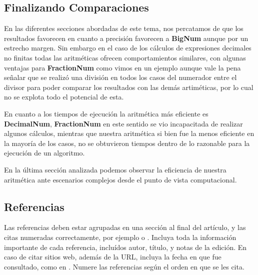 \documentclass[a4paper,10pt,twocolumn]{article}
\begin{document}
\subsection{Finalizando Comparaciones}\label{sub:big}
	En las diferentes secciones abordadas de este tema, nos percatamos de que los resultados favorecen en cuanto a precisión favorecen a \textbf{BigNum} aunque por un estrecho margen. Sin embargo en el caso de los cálculos de expresiones decimales no finitas todas las aritméticas ofrecen comportamientos similares, con algunas ventajas para \textbf{FractionNum} como vimos en un ejemplo aunque vale la pena señalar que se realizó una división en todos los casos del numerador entre el divisor para poder comparar los resultados con las demás artiméticas, por lo cual no se explota todo el potencial de esta.
	
	En cuanto a los tiempos de ejecución la aritmética más eficiente es \textbf{DecimalNum}, \textbf{FractionNum} en este sentido se vio incapacitada de realizar algunos cálculos, mientras que nuestra aritmética si bien fue la menos eficiente en la mayoría de los casos, no se obtuvieron tiempos dentro de lo razonable para la ejecución de un algoritmo.
	
	En la última sección analizada podemos observar la eficiencia de nuestra aritmética ante escenarios complejos desde el punto de vista computacional.


	

	\subsection{Referencias}
  	Las referencias deben estar agrupadas en una sección al final del artículo,
  	y las citas numeradas correctamente, por ejemplo \cite{knuth} o \cite{goedel}.
  	Incluya toda la información importante de cada referencia, incluídos autor,
  	título, y notas de la edición. En caso de citar sitios web, además
  	de la URL, incluya la fecha en que fue consultado, como en \cite{wiki}. Numere 
  	las referencias según el orden en que se les cita.




\end{document}
